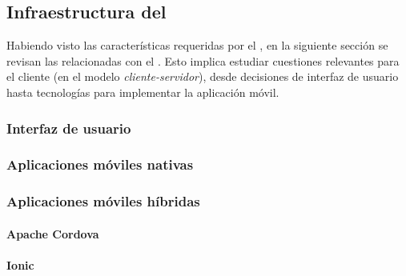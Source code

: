 \subsection{Infraestructura del }
\label{interfaz_usuario}

Habiendo visto las características requeridas por el , en la siguiente sección se revisan las relacionadas con el . Esto implica estudiar cuestiones relevantes para el cliente (en el modelo \textit{cliente-servidor}), desde decisiones de interfaz de usuario hasta tecnologías para implementar la aplicación móvil.

\subsubsection{Interfaz de usuario}
\label{interfaz_usuario}



\subsubsection{Aplicaciones móviles nativas}
\label{apps_nativas}

\subsubsection{Aplicaciones móviles híbridas}
\label{apps_hibirdas}

\paragraph{Apache Cordova}
\label{cordova}

\paragraph{Ionic}
\label{ionic}